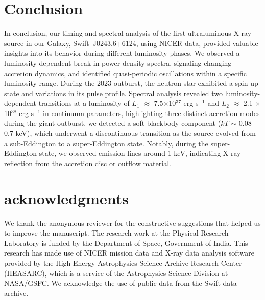 \documentclass[twocolumn,trackchanges]{aastex631}
\begin{document}
\section{Conclusion}
\label{sec:6}
In conclusion, our timing and spectral analysis of the first ultraluminous X-ray source in our Galaxy, Swift~J0243.6+6124, using NICER data, provided valuable insights into its behavior during different luminosity phases. We observed a luminosity-dependent break in power density spectra, signaling changing accretion dynamics, and identified quasi-periodic oscillations within a specific luminosity range. During the 2023 outburst, the neutron star exhibited a spin-up state and variations in its pulse profile. Spectral analysis revealed two luminosity-dependent transitions at a luminosity of $L_{1}$ $\approx$ 7.5$\times$10$^{37}$ erg s$^{-1}$ and  $L_{2}$ $\approx$ 2.1 $\times$ 10$^{38}$ erg s$^{-1}$ in continuum parameters, highlighting three distinct accretion modes during the giant outburst. we detected a soft blackbody component ($kT$ $\sim$ 0.08-0.7 keV), which underwent a discontinuous transition as the source evolved from a sub-Eddington to a super-Eddington state. Notably, during the super-Eddington state, we observed emission lines around 1 keV, indicating X-ray reflection from the accretion disc or outflow material. 


\section*{acknowledgments}
We thank the anonymous reviewer for the constructive suggestions that helped us to improve the manuscript. The research work at the Physical Research Laboratory is funded by the Department of Space, Government of India.  This research has made use of NICER mission data and X-ray data analysis software provided by the High Energy Astrophysics Science Archive Research Center (HEASARC), which is a service of the Astrophysics Science Division at NASA/GSFC. We acknowledge the use of public data from the Swift data archive. 



\vspace{5mm}





{}

\end{document}
